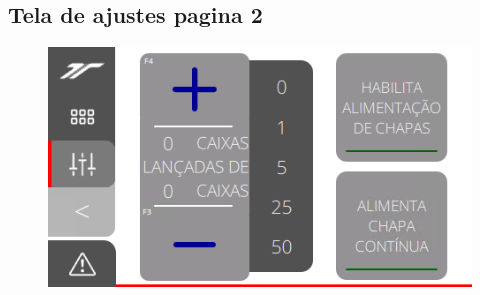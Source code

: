 \subsection{\small{Tela de ajustes pagina 2}}
\begin{figure}[h]
  \centering
  \includegraphics{src/imagesFlexo/12-IHMCNT/e-5.png}
\end{figure}
\vspace*{\fill}



